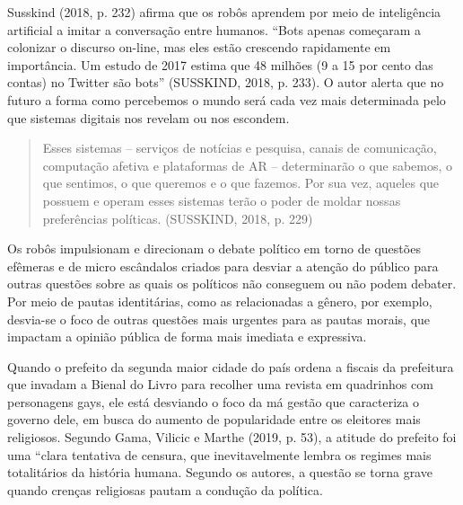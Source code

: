 Susskind (2018, p. 232) afirma que os robôs aprendem por meio de
inteligência artificial a imitar a conversação entre humanos. ``Bots
apenas começaram a colonizar o discurso on-line, mas eles estão
crescendo rapidamente em importância. Um estudo de 2017 estima que 48
milhões (9 a 15 por cento das contas) no Twitter são bots'' (SUSSKIND,
2018, p. 233). O autor alerta que no futuro a forma como percebemos o
mundo será cada vez mais determinada pelo que sistemas digitais nos
revelam ou nos escondem.

\begin{quote}
Esses sistemas -- serviços de notícias e pesquisa, canais de
comunicação, computação afetiva e plataformas de AR -- determinarão o
que sabemos, o que sentimos, o que queremos e o que fazemos. Por sua
vez, aqueles que possuem e operam esses sistemas terão o poder de moldar
nossas preferências políticas. (SUSSKIND, 2018, p. 229)
\end{quote}

Os robôs impulsionam e direcionam o debate político em torno de questões
efêmeras e de micro escândalos criados para desviar a atenção do público
para outras questões sobre as quais os políticos não conseguem ou não
podem debater. Por meio de pautas identitárias, como as relacionadas a
gênero, por exemplo, desvia-se o foco de outras questões mais urgentes
para as pautas morais, que impactam a opinião pública de forma mais
imediata e expressiva.

Quando o prefeito da segunda maior cidade do país ordena a fiscais da
prefeitura que invadam a Bienal do Livro para recolher uma revista em
quadrinhos com personagens gays, ele está desviando o foco da má gestão
que caracteriza o governo dele, em busca do aumento de popularidade
entre os eleitores mais religiosos. Segundo Gama, Vilicic e Marthe
(2019, p. 53), a atitude do prefeito foi uma ``clara tentativa de
censura, que inevitavelmente lembra os regimes mais totalitários da
história humana. Segundo os autores, a questão se torna grave quando
crenças religiosas pautam a condução da política.

